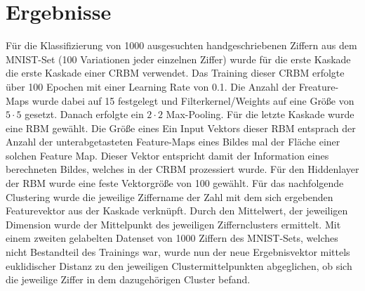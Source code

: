 \section{Ergebnisse}\label{results}

Für die Klassifizierung von 1000 ausgesuchten handgeschriebenen Ziffern aus dem MNIST-Set (100 Variationen jeder einzelnen Ziffer) wurde für die erste Kaskade die erste Kaskade einer CRBM verwendet. Das Training dieser CRBM erfolgte über 100 Epochen mit einer Learning Rate von 0.1. Die Anzahl der Freature-Maps wurde dabei auf 15 festgelegt und Filterkernel/Weights auf eine Größe von $5 \cdot 5$ gesetzt.
Danach erfolgte ein $2 \cdot 2$ Max-Pooling. Für die letzte Kaskade wurde eine RBM gewählt. Die Größe eines Ein Input Vektors dieser RBM entsprach der Anzahl der unterabgetasteten Feature-Maps eines Bildes mal der Fläche einer solchen Feature Map. 
Dieser Vektor entspricht damit der Information eines berechneten Bildes, welches in der CRBM prozessiert wurde. Für den Hiddenlayer der RBM wurde eine feste Vektorgröße von 100 gewählt.
\newline 
Für das nachfolgende Clustering wurde die jeweilige Ziffername der Zahl mit dem sich ergebenden Featurevektor aus der Kaskade verknüpft. Durch den Mittelwert, der jeweiligen Dimension wurde der Mittelpunkt des jeweiligen Ziffernclusters ermittelt.
Mit einem zweiten gelabelten Datenset von 1000 Ziffern des MNIST-Sets, welches nicht Bestandteil des Trainings war, wurde nun der neue Ergebnisvektor mittels euklidischer Distanz zu den jeweiligen Clustermittelpunkten abgeglichen, ob sich die jeweilige Ziffer in dem dazugehörigen Cluster befand.